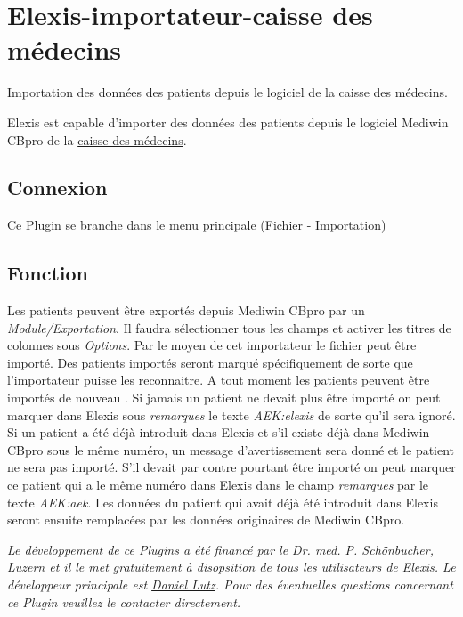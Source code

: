 \section{Elexis-importateur-caisse des médecins}
Importation des données des patients depuis le logiciel de la caisse des médecins.

 Elexis est capable d'importer des données des patients depuis le logiciel Mediwin CBpro de la   \href{http://www.aerztekasse.ch}{caisse des médecins}.

\subsection{Connexion}

Ce Plugin se branche dans le menu principale  (Fichier - Importation)

\subsection{Fonction}

Les patients peuvent être exportés depuis Mediwin CBpro par un  \textit{Module/Exportation}. Il faudra sélectionner tous les champs et activer les titres de colonnes sous \textit{Options}. Par le moyen de cet importateur le fichier peut être importé. Des patients importés seront marqué spécifiquement de sorte que l'importateur puisse les reconnaitre. A tout moment les patients peuvent être importés de nouveau . Si jamais un patient ne devait plus être importé on peut marquer dans Elexis sous  \textit{remarques}  le texte  \textit{AEK:elexis}  de sorte qu'il sera ignoré. Si un patient a été déjà introduit dans Elexis et s'il existe déjà dans Mediwin CBpro sous le même numéro, un message d'avertissement sera donné et le patient ne sera pas importé. S'il devait par contre pourtant être importé on peut marquer ce patient qui a le même numéro dans Elexis dans le champ  \textit{remarques}  par le texte  \textit{AEK:aek}. Les données du patient qui avait déjà été introduit dans Elexis seront ensuite remplacées par les données originaires de Mediwin CBpro.

\textit{Le développement de ce Plugins a été financé par le Dr. med. P. Schönbucher, Luzern et il le met gratuitement à disopsition  de tous les utilisateurs de Elexis. Le développeur principale est \href{http://www.elexis.ch/jp/component/option,com_contact/task,view/contact_id,2/Itemid,32/}{Daniel Lutz}. Pour des éventuelles questions concernant ce Plugin veuillez le contacter directement.} 